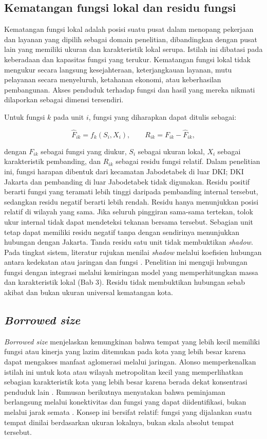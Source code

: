 \documentclass[12pt,a4paper,oneside,openany,indonesian]{report}
\begin{document}
\subsection{Kematangan fungsi lokal dan residu fungsi}

Kematangan fungsi lokal adalah posisi suatu pusat dalam menopang pekerjaan dan layanan yang dipilih sebagai domain penelitian, dibandingkan dengan pusat lain yang memiliki ukuran dan karakteristik lokal serupa. Istilah ini dibatasi pada keberadaan dan kapasitas fungsi yang terukur. Kematangan fungsi lokal tidak mengukur secara langsung kesejahteraan, keterjangkauan layanan, mutu pelayanan secara menyeluruh, ketahanan ekonomi, atau keberhasilan pembangunan. Akses penduduk terhadap fungsi dan hasil yang mereka nikmati dilaporkan sebagai dimensi tersendiri.

Untuk fungsi $k$ pada unit $i$, fungsi yang diharapkan dapat ditulis sebagai:

\[
\widehat{F}_{ik}=f_k(S_i,X_i), \qquad R_{ik}=F_{ik}-\widehat{F}_{ik},
\]

\noindent dengan $F_{ik}$ sebagai fungsi yang diukur, $S_i$ sebagai ukuran lokal, $X_i$ sebagai karakteristik pembanding, dan $R_{ik}$ sebagai residu fungsi relatif. Dalam penelitian ini, fungsi harapan dibentuk dari kecamatan Jabodetabek di luar DKI; DKI Jakarta dan pembanding di luar Jabodetabek tidak digunakan. Residu positif berarti fungsi yang teramati lebih tinggi daripada pembanding internal tersebut, sedangkan residu negatif berarti lebih rendah. Residu hanya menunjukkan posisi relatif di wilayah yang sama. Jika seluruh pinggiran sama-sama tertekan, tolok ukur internal tidak dapat mendeteksi tekanan bersama tersebut. Sebagian unit tetap dapat memiliki residu negatif tanpa dengan sendirinya menunjukkan hubungan dengan Jakarta. Tanda residu satu unit tidak membuktikan \textit{shadow}. Pada tingkat sistem, literatur rujukan menilai \textit{shadow} melalui koefisien hubungan antara kedekatan atau jaringan dan fungsi \parencite{burgeretal2015,meijersetal2016}. Penelitian ini menguji hubungan fungsi dengan integrasi melalui kemiringan model yang memperhitungkan massa dan karakteristik lokal (Bab 3). Residu tidak membuktikan hubungan sebab akibat dan bukan ukuran universal kematangan kota.

\subsection{\textit{Borrowed size}}

\textit{Borrowed size} menjelaskan kemungkinan bahwa tempat yang lebih kecil memiliki fungsi atau kinerja yang lazim ditemukan pada kota yang lebih besar karena dapat mengakses manfaat aglomerasi melalui jaringan. Alonso memperkenalkan istilah ini untuk kota atau wilayah metropolitan kecil yang memperlihatkan sebagian karakteristik kota yang lebih besar karena berada dekat konsentrasi penduduk lain \parencite{alonso1973}. Rumusan berikutnya menyatakan bahwa peminjaman berlangsung melalui konektivitas dan fungsi yang dapat diidentifikasi, bukan melalui jarak semata \parencite{meijersburger2017,meijersetal2016,burgeretal2015}. Konsep ini bersifat relatif: fungsi yang dijalankan suatu tempat dinilai berdasarkan ukuran lokalnya, bukan skala absolut tempat tersebut.
\end{document}
